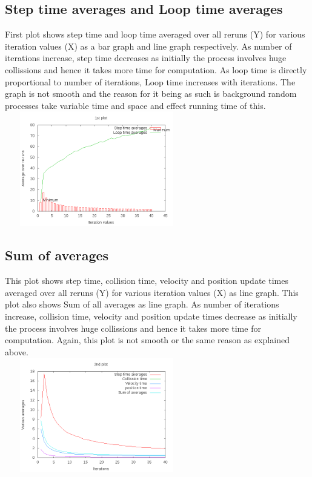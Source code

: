 \documentclass[11pt]{article}
\begin{document}
\subsection{Step time averages and Loop time averages}
First plot shows step time and loop time averaged over all reruns (Y) for various iteration values (X) as a bar graph and line graph respectively. As number of iterations increase, step time decreases 
as initially the process involves huge collissions and hence it takes more time for computation. As loop time is directly proportional to number of iterations, Loop time increases with iterations.
The graph is not smooth and the reason for it being as such is background random processes take variable time and space and effect running time of this. \\
\includegraphics[width=8cm,height=5cm]{1k.png} \\
\subsection{Sum of averages}
This plot shows step time, collision time, velocity and position update times averaged over all reruns (Y) for various iteration values (X) as line graph. This plot also shows Sum of all averages as line graph. As number of iterations increase, collision time, velocity and position update times decrease as initially the process involves huge collissions and hence it takes more time for computation. Again, this plot is not smooth or the same reason as explained above. \\
\includegraphics[width=8cm,height=5cm]{2k.png} \\
\end{document}
